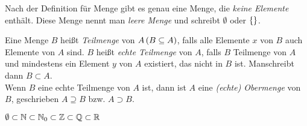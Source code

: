 \begin{definition}
Nach der Definition für Menge gibt es genau eine Menge, die \emph{keine Elemente} enthält. Diese Menge nennt man \emph{leere Menge} und schreibt $\emptyset$ oder $\left\{\right\}$.
\end{definition}

\begin{definition}
Eine Menge $B$ heißt \emph{Teilmenge} von $A \left(B \subseteq A\right)$, falls alle Elemente $x$ von $B$ auch Elemente von $A$ sind. $B$ heißt \emph{echte Teilmenge} von $A$, falls $B$ Teilmenge von $A$ und mindestens ein Element $y$ von $A$ existiert, das nicht in $B$ ist. Manschreibt dann $B \subset A$.\\
Wenn $B$ eine echte Teilmenge von $A$ ist, dann ist $A$ eine \emph{(echte) Obermenge} von $B$, geschrieben $A \supseteq B$ \ac{bzw.} $A \supset B$.
\end{definition}

\begin{example}
$\emptyset \subset \mathbb{N} \subset \mathbb{N}_0 \subset \mathbb{Z} \subset \mathbb{Q} \subset \mathbb{R}$
\end{example}

